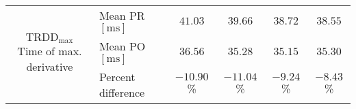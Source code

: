\begin{tabular}{|c|l|c|c|c|c|}
    \multirow{3}{*}{\parbox{2cm}{\centering \textbf{$ \text{TRDD}_{\text{max}} $}\\ {\footnotesize Time of max. derivative}}} & Mean PR $ [\si{\milli \second}] $ & $41.03$ & $39.66$ & $38.72$ & $38.55$\\
     & Mean PO $ [\si{\milli \second}] $ & $36.56$ & $35.28$ & $35.15$ & $35.30$\\
     & Percent difference & $-10.90$\% & $-11.04$\% & $-9.24$\% & $-8.43$\%\\
    \hline
\end{tabular}

